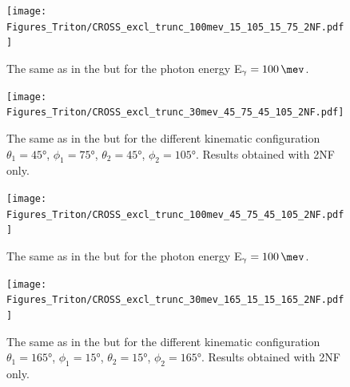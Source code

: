     \begin{figure}[h]
        \begin{center}
            \texttt{[image: Figures\_Triton/CROSS\_excl\_trunc\_100mev\_15\_105\_15\_75\_2NF.pdf]}
            \end{center}
            \caption{The same as in the  but for the photon energy
            E$_\gamma = \SI{100}{\mev}$.}
            \label{CROSS_Triton_EXCL_100mev_15_105_15_75}
    \end{figure}

    \begin{figure}[h]
        \begin{center}
            \texttt{[image: Figures\_Triton/CROSS\_excl\_trunc\_30mev\_45\_75\_45\_105\_2NF.pdf]}
            \end{center}
            \caption{The same as in the  but for the different kinematic
            configuration
            $\theta_1 = \ang{45}$, $\phi_1 = \ang{75}$,
            $\theta_2 = \ang{45}$, $\phi_2 = \ang{105}$.
            Results obtained with 2NF only.}
            \label{CROSS_Triton_EXCL_45_75_45_105}
    \end{figure}


    \begin{figure}[h]
        \begin{center}
            \texttt{[image: Figures\_Triton/CROSS\_excl\_trunc\_100mev\_45\_75\_45\_105\_2NF.pdf]}
            \end{center}
            \caption{The same as in the  but for the photon energy
            E$_\gamma = \SI{100}{\mev}$.}
            \label{CROSS_Triton_EXCL_100mev_45_75_45_105}
    \end{figure}

    \begin{figure}[h]
        \begin{center}
            \texttt{[image: Figures\_Triton/CROSS\_excl\_trunc\_30mev\_165\_15\_15\_165\_2NF.pdf]}
            \end{center}
            \caption{The same as in the  but for the different kinematic
            configuration
            $\theta_1 = \ang{165}$, $\phi_1 = \ang{15}$,
            $\theta_2 = \ang{15}$, $\phi_2 = \ang{165}$.
            Results obtained with 2NF only.}
            \label{CROSS_Triton_EXCL_165_15_15_165}
    \end{figure}


